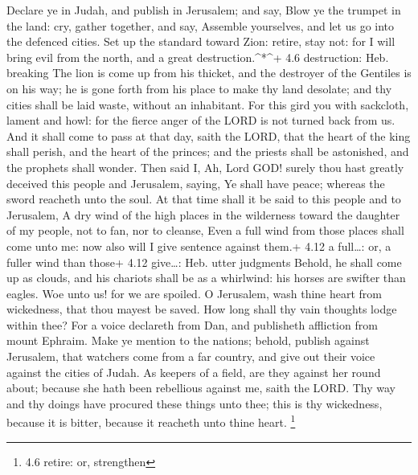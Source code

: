 Declare ye in Judah, and publish in Jerusalem; and say,
Blow ye the trumpet in the land: cry, gather together, and say, Assemble
yourselves, and let us go into the defenced cities.  Set up
the standard toward Zion: retire, stay not: for I will bring evil from
the north, and a great destruction.\^{}*\^{}+ 4.6 destruction: Heb.
breaking  The lion is come up from his thicket, and the
destroyer of the Gentiles is on his way; he is gone forth from his place
to make thy land desolate; and thy cities shall be laid waste, without
an inhabitant.  For this gird you with sackcloth, lament and
howl: for the fierce anger of the LORD is not turned back from us.
 And it shall come to pass at that day, saith the LORD, that
the heart of the king shall perish, and the heart of the princes; and
the priests shall be astonished, and the prophets shall wonder.
 Then said I, Ah, Lord GOD! surely thou hast greatly
deceived this people and Jerusalem, saying, Ye shall have peace; whereas
the sword reacheth unto the soul.  At that time shall it be
said to this people and to Jerusalem, A dry wind of the high places in
the wilderness toward the daughter of my people, not to fan, nor to
cleanse,  Even a full wind from those places shall come
unto me: now also will I give sentence against them.+ 4.12 a full\ldots:
or, a fuller wind than those+ 4.12 give\ldots: Heb. utter judgments
 Behold, he shall come up as clouds, and his chariots shall
be as a whirlwind: his horses are swifter than eagles. Woe unto us! for
we are spoiled.  O Jerusalem, wash thine heart from
wickedness, that thou mayest be saved. How long shall thy vain thoughts
lodge within thee?  For a voice declareth from Dan, and
publisheth affliction from mount Ephraim.  Make ye mention
to the nations; behold, publish against Jerusalem, that watchers come
from a far country, and give out their voice against the cities of
Judah.  As keepers of a field, are they against her round
about; because she hath been rebellious against me, saith the LORD.
 Thy way and thy doings have procured these things unto
thee; this is thy wickedness, because it is bitter, because it reacheth
unto thine heart. \footnote{4.6 retire: or, strengthen}

